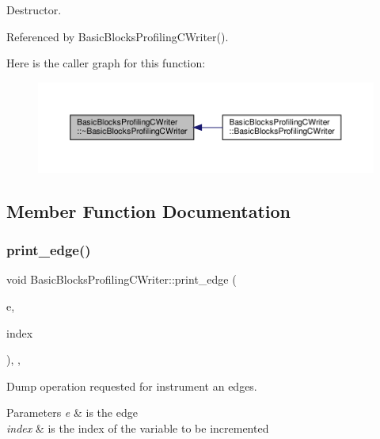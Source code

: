 Destructor. 



Referenced by Basic\+Blocks\+Profiling\+C\+Writer().

Here is the caller graph for this function\+:
\nopagebreak
\begin{figure}[H]
\begin{center}
\leavevmode
\includegraphics[width=350pt]{d1/d9c/classBasicBlocksProfilingCWriter_a38f377ad07a21acc9917fb4231fbff26_icgraph}
\end{center}
\end{figure}


\subsection{Member Function Documentation}
\mbox{\label{classBasicBlocksProfilingCWriter_a2efe4603c6a9adb508091feb50cabf5f}} 
\subsubsection{\texorpdfstring{print\+\_\+edge()}{print\_edge()}}
{\footnotesize\ttfamily void Basic\+Blocks\+Profiling\+C\+Writer\+::print\+\_\+edge (\begin{DoxyParamCaption}\item[{\hyperlink{graph_8hpp_a9eb9afea34e09f484b21f2efd263dd48}{Edge\+Descriptor}}]{e,  }\item[{unsigned int}]{index }\end{DoxyParamCaption})\hspace{0.3cm}{\ttfamily [override]}, {\ttfamily [private]}, {\ttfamily [virtual]}}



Dump operation requested for instrument an edges. 


\begin{DoxyParams}{Parameters}
{\em e} & is the edge \\
\hline
{\em index} & is the index of the variable to be incremented \\
\hline
\end{DoxyParams}



